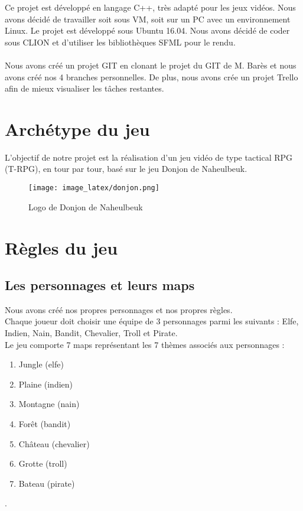 \documentclass[a4paper,12pt]{report}
\begin{document}
		Ce projet est développé en langage C++, très adapté pour les jeux vidéos. Nous avons décidé de travailler soit sous VM, soit sur un PC avec un environnement Linux. Le projet est développé sous Ubuntu 16.04. Nous avons décidé de coder sous CLION et d'utiliser les bibliothèques SFML pour le rendu. \\ \\

		Nous avons créé un projet GIT en clonant le projet du GIT de M. Barès et nous avons créé nos 4 branches personnelles.
		De plus, nous avons crée un projet Trello afin de mieux visualiser les tâches restantes.
	
	
	
	
	
	\section{Archétype du jeu}
	L'objectif de notre projet est la réalisation d'un jeu vidéo de type tactical RPG (T-RPG), en tour par tour, basé sur le jeu Donjon de Naheulbeuk. 
	
	\begin{figure}[h]
		\centering
		\texttt{[image: image\_latex/donjon.png]}
		\caption{Logo de Donjon de Naheulbeuk}
	\end{figure}
	
	
	
	\section{Règles du jeu}
	
	
	\subsection{Les personnages et leurs maps}
	Nous avons créé nos propres personnages et nos propres règles.\\
	Chaque joueur doit choisir une équipe de 3 personnages parmi les suivants : Elfe, Indien, Nain, Bandit, Chevalier, Troll et Pirate.  \\

	\indent Le jeu comporte 7 maps représentant les 7 thèmes associés aux personnages : 
	\begin{enumerate}
		\item Jungle (elfe)
		\item Plaine (indien)
		\item Montagne (nain)
		\item Forêt (bandit)
		\item Château (chevalier)
		\item Grotte (troll)
		\item Bateau (pirate)
	\end{enumerate}	
	. \\ 
	
\end{document}
